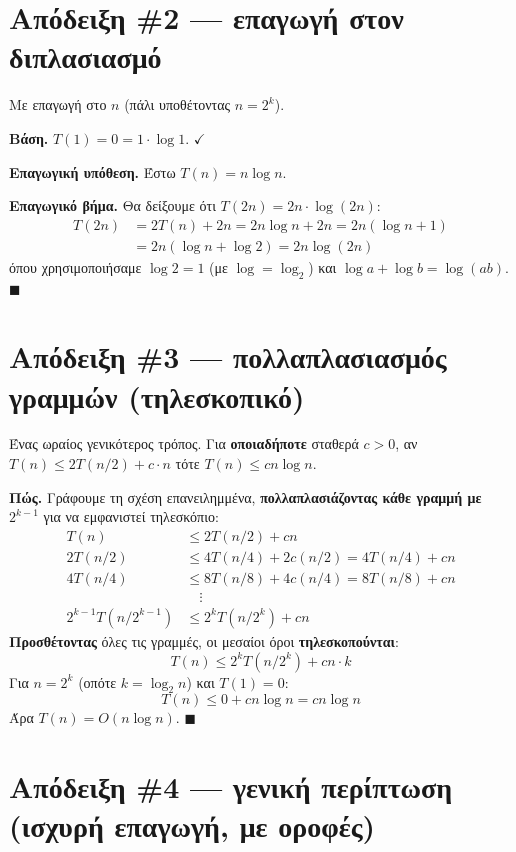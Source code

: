 \documentclass[11pt,a4paper]{article}
\begin{document}
\section{Απόδειξη \#2 --- επαγωγή στον διπλασιασμό}

Με επαγωγή στο $n$ (πάλι υποθέτοντας $n = 2^k$).

\textbf{Βάση.} $T(1) = 0 = 1 \cdot \log 1$. $\checkmark$

\textbf{Επαγωγική υπόθεση.} Έστω $T(n) = n \log n$.

\textbf{Επαγωγικό βήμα.} Θα δείξουμε ότι $T(2n) = 2n \cdot \log(2n)$:
\[
\begin{aligned}
T(2n) &= 2 T(n) + 2n = 2 n \log n + 2n = 2 n (\log n + 1) \\
      &= 2 n (\log n + \log 2) = 2 n \log(2n)
\end{aligned}
\]
όπου χρησιμοποιήσαμε $\log 2 = 1$ (με $\log = \log_2$) και $\log a + \log b =
\log(ab)$. $\blacksquare$

\section{Απόδειξη \#3 --- πολλαπλασιασμός γραμμών (τηλεσκοπικό)}

Ένας ωραίος γενικότερος τρόπος. Για \textbf{οποιαδήποτε} σταθερά $c > 0$, αν
$T(n) \le 2 T(n/2) + c \cdot n$ τότε $T(n) \le c n \log n$.

\textbf{Πώς.} Γράφουμε τη σχέση επανειλημμένα, \textbf{πολλαπλασιάζοντας κάθε
γραμμή με $2^{k-1}$} για να εμφανιστεί τηλεσκόπιο:
\[
\begin{aligned}
T(n)              &\le 2 T(n/2) + cn \\
2 T(n/2)          &\le 4 T(n/4) + 2 c (n/2) = 4 T(n/4) + cn \\
4 T(n/4)          &\le 8 T(n/8) + 4 c (n/4) = 8 T(n/8) + cn \\
                  &\quad \vdots \\
2^{k-1} T(n/2^{k-1}) &\le 2^k T(n/2^k) + cn
\end{aligned}
\]
\textbf{Προσθέτοντας} όλες τις γραμμές, οι μεσαίοι όροι \textbf{τηλεσκοπούνται}:
\[
T(n) \le 2^k T(n/2^k) + cn \cdot k
\]
Για $n = 2^k$ (οπότε $k = \log_2 n$) και $T(1) = 0$:
\[
T(n) \le 0 + cn \log n = cn \log n
\]
Άρα $T(n) = O(n \log n)$. $\blacksquare$

\section{Απόδειξη \#4 --- γενική περίπτωση (ισχυρή επαγωγή, με οροφές)}
\end{document}
